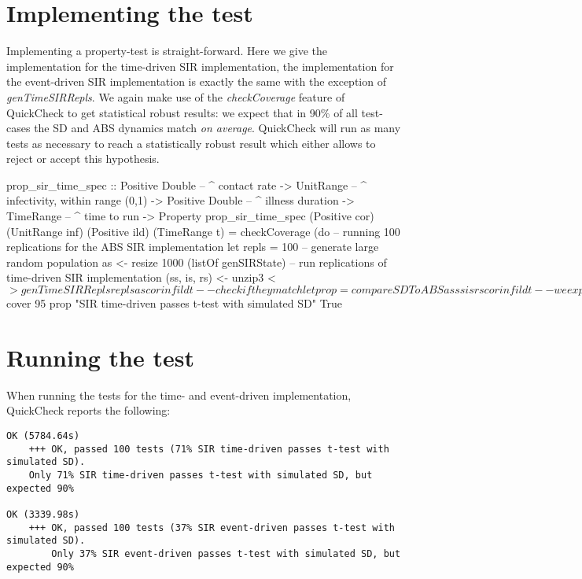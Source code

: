 \section{Implementing the test}
Implementing a property-test is straight-forward. Here we give the implementation for the time-driven SIR implementation, the implementation for the event-driven SIR implementation is exactly the same with the exception of \textit{genTimeSIRRepls}. We again make use of the \textit{checkCoverage} feature of QuickCheck to get statistical robust results: we expect that in 90\% of all test-cases the SD and ABS dynamics match \textit{on average}. QuickCheck will run as many tests as necessary to reach a statistically robust result which either allows to reject or accept this hypothesis.

\begin{HaskellCode}
prop_sir_time_spec :: Positive Double  -- ^ contact rate
                   -> UnitRange        -- ^ infectivity, within range (0,1)
                   -> Positive Double  -- ^ illness duration
                   -> TimeRange        -- ^ time to run
                   -> Property
prop_sir_time_spec 
    (Positive cor) (UnitRange inf) (Positive ild) (TimeRange t) = checkCoverage (do
  -- running 100 replications for the ABS SIR implementation
  let repls = 100
  -- generate large random population
  as <- resize 1000 (listOf genSIRState)
  -- run replications of time-driven SIR implementation
  (ss, is, rs) <- unzip3 <$> genTimeSIRRepls repls as cor inf ild t
  -- check if they match 
  let prop = compareSDToABS as ss is rs cor inf ild t
  -- we expect 95%
  return $ cover 95 prop "SIR time-driven passes t-test with simulated SD" True
\end{HaskellCode}

\section{Running the test}
When running the tests for the time- and event-driven implementation, QuickCheck reports the following:

\begin{verbatim}
OK (5784.64s)
    +++ OK, passed 100 tests (71% SIR time-driven passes t-test with simulated SD).
    Only 71% SIR time-driven passes t-test with simulated SD, but expected 90%

OK (3339.98s)
    +++ OK, passed 100 tests (37% SIR event-driven passes t-test with simulated SD).
        Only 37% SIR event-driven passes t-test with simulated SD, but expected 90%
\end{verbatim}

